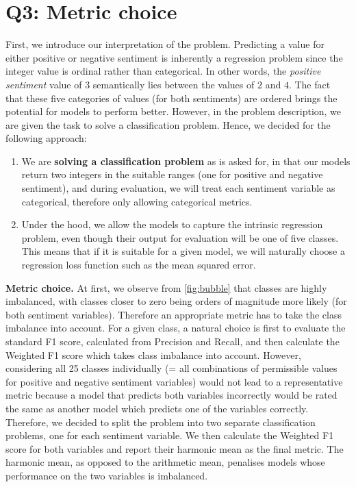 \section*{Q3: Metric choice}
First, we introduce our interpretation of the problem. Predicting a value for either positive or negative sentiment is inherently a regression problem since the integer value is ordinal rather than categorical. In other words, the \textit{positive sentiment} value of $3$ semantically lies between the values of $2$ and $4$. The fact that these five categories of values (for both sentiments) are ordered brings the potential for models to perform better. However, in the problem description, we are given the task to solve a classification problem. Hence, we decided for the following approach:
\begin{enumerate}
    \item We are \textbf{solving a classification problem} as is asked for, in that our models return two integers in the suitable ranges (one for positive and negative sentiment), and during evaluation, we will treat each sentiment variable as categorical, therefore only allowing categorical metrics.
    \item Under the hood, we allow the models to capture the intrinsic regression problem, even though their output for evaluation will be one of five classes. This means that if it is suitable for a given model, we will naturally choose a regression loss function such as the mean squared error.
\end{enumerate}

\textbf{Metric choice.}
At first, we observe from \cref{fig:bubble} that classes are highly imbalanced, with classes closer to zero being orders of magnitude more likely (for both sentiment variables). Therefore an appropriate metric has to take the class imbalance into account. For a given class, a natural choice is first to evaluate the standard F1 score, calculated from Precision and Recall, and then calculate the Weighted F1 score which takes class imbalance into account. However, considering all 25 classes individually (= all combinations of permissible values for positive and negative sentiment variables) would not lead to a representative metric because a model that predicts both variables incorrectly would be rated the same as another model which predicts one of the variables correctly. Therefore, we decided to split the problem into two separate classification problems, one for each sentiment variable. We then calculate the Weighted F1 score for both variables and report their harmonic mean as the final metric. The harmonic mean, as opposed to the arithmetic mean, penalises models whose performance on the two variables is imbalanced.

